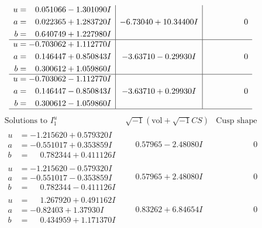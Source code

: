 \documentclass[1p]{elsarticle_modified}
\theoremstyle{definition}
\newcommand{\I}{\sqrt{-1}}
\begin{document}
$$\begin{array}{c|c|c}
\begin{aligned}
u &= \phantom{-}0.051066 - 1.301090 I \\
a &= \phantom{-}0.022365 + 1.283720 I \\
b &= \phantom{-}0.640749 + 1.227980 I\end{aligned}
 & -6.73040 + 10.34400 I & \phantom{-0.000000 } 0 \\ \hline\begin{aligned}
u &= -0.703062 + 1.112770 I \\
a &= \phantom{-}0.146447 + 0.850843 I \\
b &= \phantom{-}0.300612 + 1.059860 I\end{aligned}
 & -3.63710 - 0.29930 I & \phantom{-0.000000 } 0 \\ \hline\begin{aligned}
u &= -0.703062 - 1.112770 I \\
a &= \phantom{-}0.146447 - 0.850843 I \\
b &= \phantom{-}0.300612 - 1.059860 I\end{aligned}
 & -3.63710 + 0.29930 I & \phantom{-0.000000 } 0\\
 \hline 
 \end{array}$$\newpage$$\begin{array}{c|c|c}  
\text{Solutions to }I^u_{1}& \I (\text{vol} + \sqrt{-1}CS) & \text{Cusp shape}\\
 \hline 
\begin{aligned}
u &= -1.215620 + 0.579320 I \\
a &= -0.551017 + 0.353859 I \\
b &= \phantom{-}0.782344 + 0.411126 I\end{aligned}
 & \phantom{-}0.57965 - 2.48080 I & \phantom{-0.000000 } 0 \\ \hline\begin{aligned}
u &= -1.215620 - 0.579320 I \\
a &= -0.551017 - 0.353859 I \\
b &= \phantom{-}0.782344 - 0.411126 I\end{aligned}
 & \phantom{-}0.57965 + 2.48080 I & \phantom{-0.000000 } 0 \\ \hline\begin{aligned}
u &= \phantom{-}1.267920 + 0.491162 I \\
a &= -0.82403 + 1.37930 I \\
b &= \phantom{-}0.434959 + 1.171370 I\end{aligned}
 & \phantom{-}0.83262 + 6.84654 I & \phantom{-0.000000 } 0 \\ \hline\begin{aligned}

\end{aligned}
\end{array}$$
\end{document}
